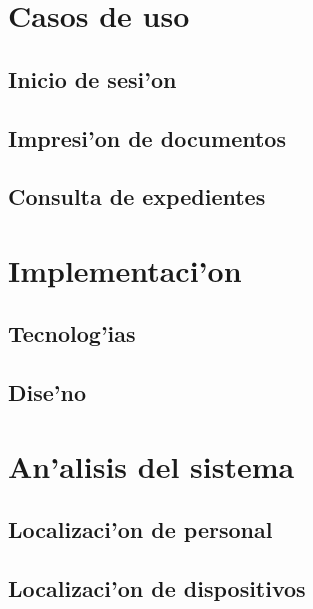 \documentclass[a4paper,12pt]{article}
\begin{document}
\pagebreak

\index \section{Casos de uso}

	\subsection{Inicio de sesi'on}
		

	\subsection{Impresi'on de documentos}
		

	\subsection{Consulta de expedientes}
				

\pagebreak

\section{Implementaci'on}

	\subsection{Tecnolog'ias}
				

	\subsection{Dise'no}
		

\pagebreak

\section{An'alisis del sistema}

	\index \subsection{Localizaci'on de personal}
		

	\subsection{Localizaci'on de dispositivos}
		
\end{document}
